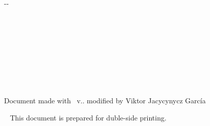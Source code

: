 {\begin{cambiamargen}{-\cambioIzquierdo}{-\cambioDerecho}
\begin{large}
\begin{center}
  \textbf{\autorPortadaVal}%


\leavevmode \\\relax \mbox{ }%
\textoSegundoSubtituloPortadaVal \leavevmode \\[0.3]
\leavevmode \\\relax \mbox{ }%

\textbf{\institucionVal}\leavevmode \\[1em]
\textbf{\fechaPublicacionVal}

\end{center}

\end{large}

\vfill %

\end{cambiamargen}

\newpage

\thispagestyle{empty}
\mbox{ }
\vfill%
\begin{small}
\begin{center}
\ifx\noTeXiSCreditsVal\undefined
  Document made with \texis\ v.\texisVer. modified by Viktor Jacycynycz García
\else
\mbox{ }
\fi
\end{center}
\end{small}
\vspace*{2cm}
\begin{small}
\begin{center}
\ifx\explicacionDobleCaraVal\undefined
\mbox{ }
\else
\noindent This document is prepared for duble-side printing.
\fi
\end{center}
\end{small}


\newpage

\thispagestyle{empty}

\mbox{ }

\begin{Huge}
\begin{center}
\tituloPortadaVal
\end{center}
\end{Huge}

}
